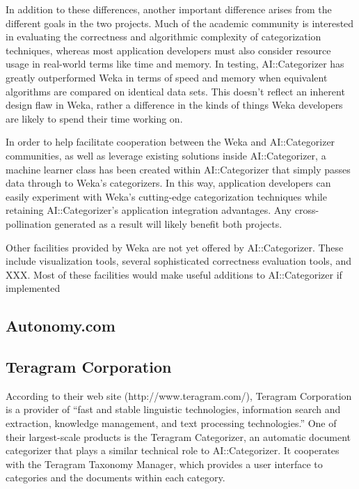 \documentclass[a4paper]{report}
\begin{document}
In addition to these differences, another important difference arises
from the different goals in the two projects.  Much of the academic
community is interested in evaluating the correctness and algorithmic
complexity of categorization techniques, whereas most application
developers must also consider resource usage in real-world terms like
time and memory.  In testing, AI::Categorizer has greatly outperformed
Weka in terms of speed and memory when equivalent algorithms are
compared on identical data sets.  This doesn't reflect an inherent
design flaw in Weka, rather a difference in the kinds of things Weka
developers are likely to spend their time working on.

In order to help facilitate cooperation between the Weka and
AI::Categorizer communities, as well as leverage existing solutions
inside AI::Categorizer, a machine learner class has been created
within AI::Categorizer that simply passes data through to Weka's
categorizers.  In this way, application developers can easily
experiment with Weka's cutting-edge categorization techniques while
retaining AI::Categorizer's application integration advantages.  Any
cross-pollination generated as a result will likely benefit both
projects.

Other facilities provided by Weka are not yet offered by
AI::Categorizer.  These include visualization tools, several
sophisticated correctness evaluation tools, and XXX.  Most of these
facilities would make useful additions to AI::Categorizer if
implemented

\subsection{Autonomy.com}

\subsection{Teragram Corporation}

According to their web site (http://www.teragram.com/), Teragram
Corporation is a provider of ``fast and stable linguistic
technologies, information search and extraction, knowledge management,
and text processing technologies.''  One of their largest-scale
products is the Teragram Categorizer, an automatic document
categorizer that plays a similar technical role to AI::Categorizer.
It cooperates with the Teragram Taxonomy Manager, which provides a
user interface to categories and the documents within each category.
\end{document}
